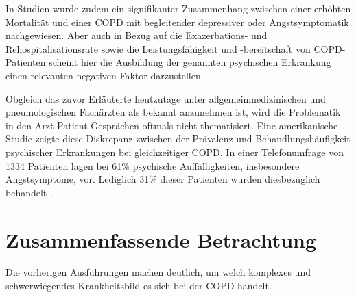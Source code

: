 In Studien wurde zudem ein signifikanter Zusammenhang zwischen einer erhöhten Mortalität und einer COPD mit begleitender depressiver oder Angstsymptomatik nachgewiesen. Aber auch in Bezug auf die Exazerbations- und Rehospitalisationsrate sowie die Leistungsfähigkeit und -bereitschaft von COPD-Patienten scheint hier die Ausbildung der genannten psychischen Erkrankung einen relevanten negativen Faktor darzustellen\autocite[vgl.]{kenn2011}.

Obgleich das zuvor Erläuterte heutzutage unter allgemeinmedizinischen und pneumologischen Fachärzten als bekannt anzunehmen ist, wird die Problematik in den Arzt-Patient-Gesprächen oftmals nicht thematisiert. Eine amerikanische Studie zeigte diese Diskrepanz zwischen der Prävalenz und Behandlungshäufigkeit psychischer Erkrankungen bei gleichzeitiger COPD. In einer Telefonumfrage von 1334 Patienten lagen bei 61\% psychische Auffälligkeiten, insbesondere Angstsymptome, vor. Lediglich 31\% dieser Patienten wurden diesbezüglich behandelt \autocite[vgl.][156]{fischer2007}.


\section{Zusammenfassende Betrachtung}
\label{zusammenfassende betrachtung}
Die vorherigen Ausführungen machen deutlich, um welch komplexes und schwerwiegendes Krankheitsbild es sich bei der COPD handelt. 

\newpage\thispagestyle{empty}